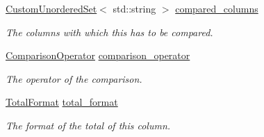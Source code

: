 \begin{DoxyCompactItemize}
\hyperlink{classCustomUnorderedSet}{Custom\+Unordered\+Set}$<$ std\+::string $>$ \hyperlink{classTranslator_1_1LatexColumnFormat_a44905b825a903d8916d4dd7da8c153fa}{compared\+\_\+columns}
\begin{DoxyCompactList}\small\item\em The columns with which this has to be compared. \end{DoxyCompactList}\item 
\hyperlink{classTranslator_1_1LatexColumnFormat_a9401c4c02f92f224268e919aac9cb15e}{Comparison\+Operator} \hyperlink{classTranslator_1_1LatexColumnFormat_afc274f6b1cffbb7a738dd41104922cfe}{comparison\+\_\+operator}
\begin{DoxyCompactList}\small\item\em The operator of the comparison. \end{DoxyCompactList}\item 
\hyperlink{classTranslator_1_1LatexColumnFormat_a0754fb96fce28c9f04a8ef5353eede60}{Total\+Format} \hyperlink{classTranslator_1_1LatexColumnFormat_a2bc467e238e3ca6a5a14337c464a9069}{total\+\_\+format}
\begin{DoxyCompactList}\small\item\em The format of the total of this column. \end{DoxyCompactList}\end{DoxyCompactItemize}
